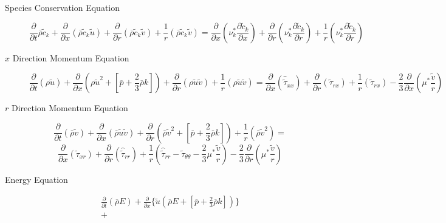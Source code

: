 \begin{description}
	\item[Species Conservation Equation]
	\begin{displaymath}
	\frac{\partial}{\partial t}\overline{\rho}\tilde c_k + \frac{\partial}{\partial x}
	(\overline{\rho}\tilde c_k\tilde{u})  + \frac{\partial}{\partial r}
	(\overline{\rho}\tilde c_k\tilde{v})	+ \frac{1}{r}
	(\overline{\rho}\tilde c_k\tilde{v}) = \frac{\partial}{\partial x}(
	\nu_k^*\frac{\partial \tilde c_k}{\partial x}) +
	\frac{\partial}{\partial r} (\nu_k^*\frac{\partial \tilde c_k}{\partial r})
	+ \frac{1}{r}(\nu_k^*\frac{\partial \tilde c_k}{\partial r})
	\end{displaymath}
	\item[$x$ Direction Momentum Equation]
	\begin{displaymath}
	\frac{\partial}{\partial t}(\rho \tilde{u}) + \frac{\partial}{\partial x}(\rho \tilde{u}^2 + 
	[\overline{p}+\frac{2}{3}\overline{\rho}k]) +
	\frac{\partial}{\partial r}(\rho \tilde{u}\tilde{v}) + \frac{1}{r}(\rho \tilde{u} \tilde{v}) =  
	\frac{\partial}{\partial x}(\hat{\tilde{\tau}}_{xx}) + \frac{\partial}{\partial r}(\tilde{\tau}_{rx}) 
	+ \frac{1}{r}(\tilde{\tau}_{rx}) - \frac{2}{3}\frac{\partial}{\partial x}(\mu^* \frac{\tilde v}{r})
	\end{displaymath}
	\item[$r$ Direction Momentum Equation]
	\begin{displaymath}
	\frac{\partial}{\partial t}(\overline{\rho}\tilde{v}) + \frac{\partial}{\partial x}
	(\overline{\rho}\tilde{u}\tilde{v}) + \frac{\partial}{\partial r}(\overline{\rho}\tilde{v}^2 + 
	[\overline{p} + \frac{2}{3}\overline{\rho}k])
	+ \frac{1}{r}(\overline{\rho}\tilde{v}^2) = 
	\end{displaymath}
	\begin{displaymath}
	\frac{\partial}{\partial x}(\tilde\tau_{xr}) + \frac{\partial}{\partial r}(\hat{\tilde\tau}_{rr}) + 
	\frac{1}{r}(\hat{\tilde\tau}_{rr} - \tilde\tau_{\theta \theta} -\frac{2}{3}\mu^*\frac{\tilde v}{r}) - \frac{2}{3}
	\frac{\partial}{\partial r}(\mu^*\frac{\tilde v}{r})
	\end{displaymath}
	\item[Energy Equation]
	\begin{displaymath}
	\begin{array}{c}
		\frac{\partial}{\partial t}(\overline{\rho}E) +
		\frac{\partial}{\partial x}\Big\{\tilde u(\overline{\rho}E + [\overline{p} + \frac{2}{3}\overline{\rho}k])\Big\} 
		 \\ +

\end{array}
\end{displaymath}
\end{description}
